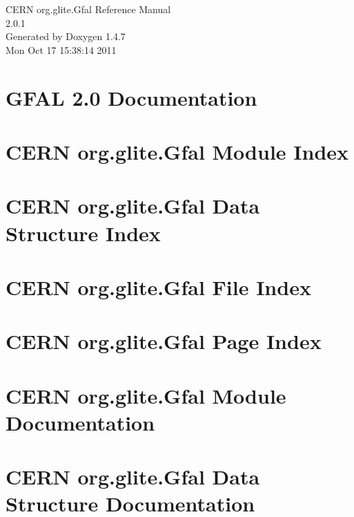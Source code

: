 \documentclass[a4paper]{book}
\begin{document}
\begin{titlepage}
\vspace*{7cm}
\begin{center}
{\Large CERN org.glite.Gfal Reference Manual\\[1ex]\large 2.0.1 }\\
\vspace*{1cm}
{\large Generated by Doxygen 1.4.7}\\
\vspace*{0.5cm}
{\small Mon Oct 17 15:38:14 2011}\\
\end{center}
\end{titlepage}
\clearemptydoublepage
{}
\tableofcontents
\clearemptydoublepage
{}
\chapter{GFAL 2.0 Documentation }
\label{index}
\chapter{CERN org.glite.Gfal Module Index}

\chapter{CERN org.glite.Gfal Data Structure Index}

\chapter{CERN org.glite.Gfal File Index}

\chapter{CERN org.glite.Gfal Page Index}

\chapter{CERN org.glite.Gfal Module Documentation}

\chapter{CERN org.glite.Gfal Data Structure Documentation}








\end{document}
